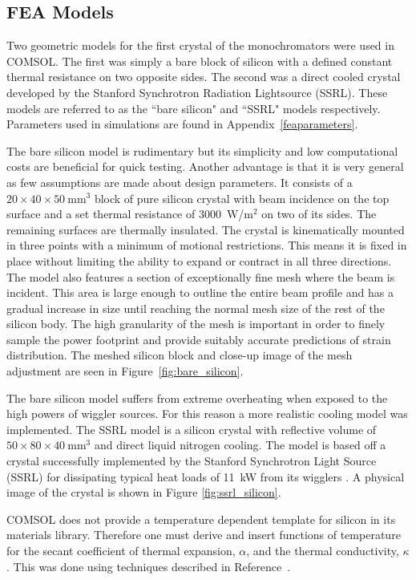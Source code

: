 \documentclass{iucr}
\begin{document}
\subsection{FEA Models}

Two geometric models for the first crystal of the monochromators were used in COMSOL. The first was simply a bare block of silicon with a defined constant thermal resistance on two opposite sides. The second was a direct cooled crystal developed by the Stanford Synchrotron Radiation Lightsource (SSRL). These models are referred to as the ``bare silicon" and ``SSRL" models respectively. Parameters used in simulations are found in Appendix~\ref{feaparameters}.

The bare silicon model is rudimentary but its simplicity and low computational costs are beneficial for quick testing. Another advantage is that it is very general as few assumptions are made about design parameters. It consists of a $20\times 40\times 50~$mm$^3$ block of pure silicon crystal with beam incidence on the top surface and a set thermal resistance of 3000~W/m$^2$ on two of its sides. The remaining surfaces are thermally insulated. The crystal is kinematically mounted in three points with a minimum of motional restrictions. This means it is fixed in place without limiting the ability to expand or contract in all three directions. The model also features a section of exceptionally fine mesh where the beam is incident. This area is large enough to outline the entire beam profile and has a gradual increase in size until reaching the normal mesh size of the rest of the silicon body. The high granularity of the mesh is important in order to finely sample the power footprint and provide suitably accurate predictions of strain distribution. The meshed silicon block and close-up image of the mesh adjustment are seen in Figure~\ref{fig:bare_silicon}.

The bare silicon model suffers from extreme overheating when exposed to the high powers of wiggler sources. For this reason a more realistic cooling model was implemented. The SSRL model is a silicon crystal with reflective volume of $50\times 80\times 40~$mm$^3$ and direct liquid nitrogen cooling. The model is based off a crystal successfully implemented by the Stanford Synchrotron Light Source (SSRL) for dissipating typical heat loads of 11~kW from its wigglers \cite{stanford}. A physical image of the crystal is shown in Figure \ref{fig:ssrl_silicon}.

COMSOL does not provide a temperature dependent template for silicon in its materials library. Therefore one must derive and insert functions of temperature for the secant coefficient of thermal expansion, $\alpha$, and the thermal conductivity, $\kappa$. This was done using techniques described in Reference~\cite{mash}.
\end{document}
